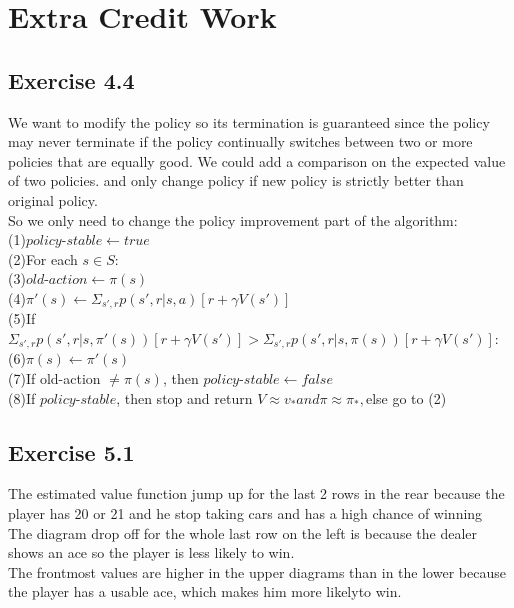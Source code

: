 \documentclass[12pt]{article}
\begin{document}
\pagebreak

\section{Extra Credit Work}
\subsection{Exercise 4.4}
We want to modify the policy so its termination is guaranteed since the policy  may never terminate if the policy continually switches between two or more policies that are equally good.  We could add a comparison on the expected value of two policies. and only change policy if new policy is strictly better than original policy.\\
So we only need to change the policy improvement part of the algorithm:\\

(1)$policy$-$stable \leftarrow true$\\
(2)For each $s \in S$:\\
(3)\qquad$old$-$action\leftarrow\pi(s)$\\
(4)\qquad$\pi'(s) \leftarrow \Sigma_{s',r} p(s',r|s,a)[r + \gamma V(s')]$\\
(5)\qquad If $\Sigma_{s',r} p(s',r|s,\pi'(s))[r + \gamma V(s')] > \Sigma_{s',r} p(s',r|s,\pi(s))[r + \gamma V(s')]$:\\
(6)\qquad\qquad $\pi(s) \leftarrow \pi'(s)$ \\
(7)\qquad If old-action $\ne \pi(s)$, then $policy$-$stable\leftarrow false$  \\
(8)If $policy$-$stable$, then stop and return $V\approx v_* and \pi \approx \pi_*,$else go to (2)\\


\subsection{Exercise 5.1}
The estimated value function jump up for the last 2 rows in the rear because the player has 20 or 21 and he stop taking cars and has a high chance of winning\\

The diagram drop off for the whole last row on the left is because the dealer shows an ace so the player is less likely to win.\\

The frontmost values are higher in the upper diagrams than in the lower because the player has a usable ace, which makes him more likelyto win.

\pagebreak
\end{document}
